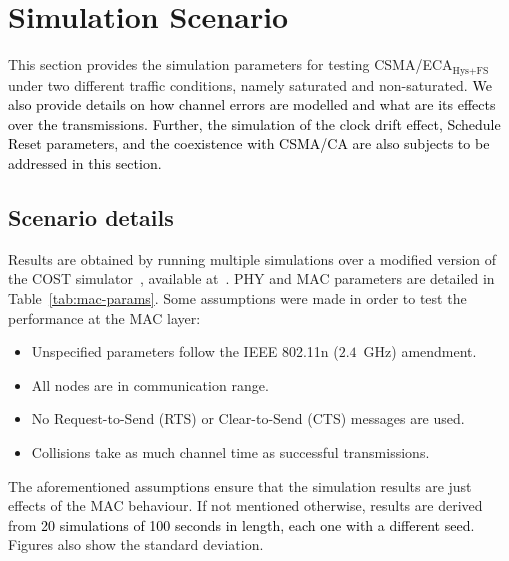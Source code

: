 \section{Simulation Scenario}\label{simulations}
This section provides the simulation parameters for testing CSMA/ECA$_{\text{Hys+FS}}$ under two different traffic conditions, namely saturated and non-saturated. \textcolor{black}{We also provide details on how channel errors are modelled and what are its effects over the transmissions. Further, the simulation of the clock drift effect, Schedule Reset parameters, and the coexistence with CSMA/CA are also subjects to be addressed in this section.}

	\subsection{Scenario details}
	Results are obtained by running multiple simulations over a modified version of the COST simulator~\cite{COST}, available at~\cite{sim:parameters-TON}. PHY and MAC parameters are detailed in Table~\ref{tab:mac-params}. Some assumptions were made in order to test the performance at the MAC layer:
	
	\begin{itemize}
		\item Unspecified parameters follow the IEEE 802.11n ($2.4$~GHz) amendment.
		\item All nodes are in communication range.
		\item No Request-to-Send (RTS) or Clear-to-Send (CTS) messages are used.
		\item Collisions take as much channel time as successful transmissions.
	\end{itemize}
	
	The aforementioned assumptions ensure that the simulation results are just effects of the MAC behaviour.
	If not mentioned otherwise, results are derived from \textcolor{black}{20 simulations of 100 seconds in length, each one with a different seed}. Figures also show the standard deviation.
	
